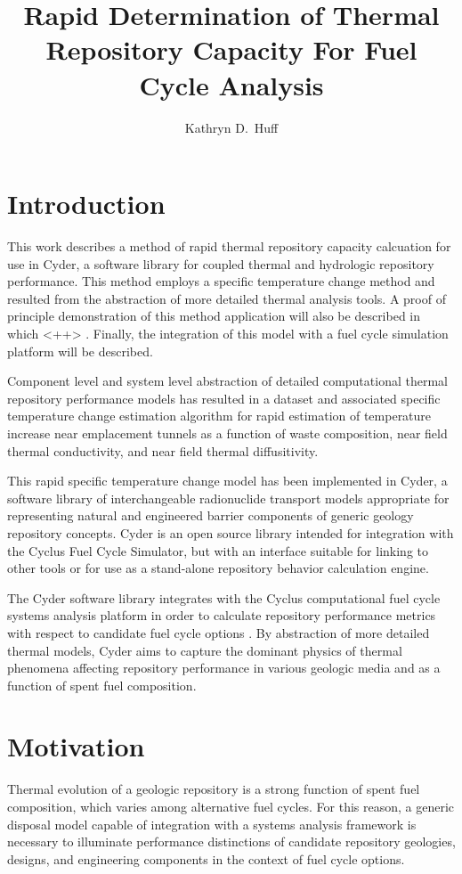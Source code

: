 \documentclass{anstrans}
\title{Rapid Determination of Thermal Repository Capacity For Fuel Cycle Analysis}
\author{Kathryn D.~Huff}
\institute{Department of Nuclear Engineering \& Engineering Physics, University of Wisconsin, Madison, WI, 53706}
\date{}
\begin{document}
\section{Introduction}

This work describes a method of rapid thermal repository capacity calcuation for 
use in Cyder, a software library for coupled thermal and hydrologic repository 
performance. This method employs a specific temperature change method and 
resulted from the abstraction of more detailed thermal analysis tools. A proof 
of principle demonstration of this method application will also be described in 
which <++> .
Finally, the integration of this model with a fuel cycle simulation platform will be described.

Component level and system level abstraction of detailed computational thermal 
repository performance models has resulted in a dataset and associated specific 
temperature change estimation algorithm for rapid estimation of temperature 
increase near emplacement tunnels as a function of waste composition,
near field thermal conductivity, and near field thermal diffusitivity. 

This rapid specific temperature change model has been implemented in Cyder, 
a software library of interchangeable 
radionuclide transport models appropriate for representing natural and 
engineered barrier components of generic geology repository concepts.
Cyder is an open source library intended for integration with the 
Cyclus Fuel Cycle Simulator, but with an interface suitable for linking to other 
tools or for use as a stand-alone repository behavior calculation engine. 

The Cyder software library integrates with 
the Cyclus computational fuel cycle systems analysis platform in order to 
calculate repository performance metrics with respect to candidate fuel cycle 
options \cite{huff_cyder_2012,huff_cyclus:_2010}. By abstraction of more 
detailed thermal models, Cyder aims to capture the dominant 
physics of thermal phenomena affecting repository performance in 
various geologic media and as a function of spent fuel composition.

\section{Motivation}
Thermal evolution of a geologic repository is a strong function 
of spent fuel composition, which varies among alternative fuel cycles. For this 
reason, a generic disposal model capable of integration with a systems analysis 
framework is necessary to illuminate performance distinctions of candidate 
repository geologies, designs, and engineering components in the context of fuel 
cycle options. 
\end{document}
